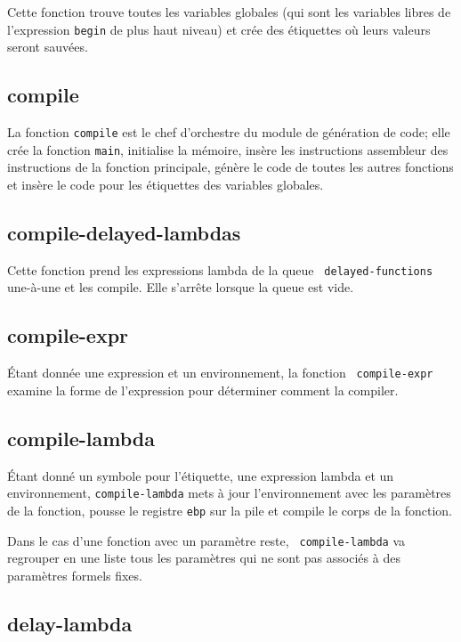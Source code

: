 \documentclass[10pt]{report}
\begin{document}
Cette fonction trouve toutes les variables globales (qui sont les
variables libres de l'expression {\tt begin} de plus haut niveau) et
crée des étiquettes où leurs valeurs seront sauvées.

\subsection{compile}

La fonction {\tt compile} est le chef d'orchestre du module de
génération de code; elle crée la fonction {\tt main}, initialise la
mémoire, insère les instructions assembleur des instructions de la
fonction principale, génère le code de toutes les autres fonctions et
insère le code pour les étiquettes des variables globales.


\subsection{compile-delayed-lambdas}

Cette fonction prend les expressions lambda de la queue {\tt
  delayed-functions} une-à-une et les compile.  Elle s'arrête lorsque
la queue est vide.


\subsection{compile-expr}

Étant donnée une expression et un environnement, la fonction {\tt
  compile-expr} examine la forme de l'expression pour déterminer
comment la compiler.

\subsection{compile-lambda}

Étant donné un symbole pour l'étiquette, une expression lambda et un
environnement, {\tt compile-lambda} mets à jour l'environnement avec
les paramètres de la fonction, pousse le registre {\tt ebp} sur la
pile et compile le corps de la fonction.

Dans le cas d'une fonction avec un paramètre reste, {\tt
  compile-lambda} va regrouper en une liste tous les paramètres qui ne
sont pas associés à des paramètres formels fixes.

\subsection{delay-lambda}
\end{document}
